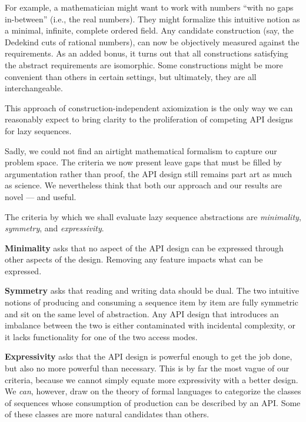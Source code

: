 \documentclass[sigplan,screen,10pt,review]{acmart}
\begin{document}
For example, a mathematician might want to work with numbers ``with no gaps in-between'' (i.e., the real numbers). They might formalize this intuitive notion as a minimal, infinite, complete ordered field. Any candidate construction (say, the Dedekind cuts of rational numbers), can now be objectively measured against the requirements. As an added bonus, it turns out that all constructions satisfying the abstract requirements are isomorphic. Some constructions might be more convenient than others in certain settings, but ultimately, they are all interchangeable.

This approach of construction-independent axiomization is the only way we can reasonably expect to bring clarity to the proliferation of competing API designs for lazy sequences.

Sadly, we could not find an airtight mathematical formalism to capture our problem space. The criteria we now present leave gaps that must be filled by argumentation rather than proof, the API design still remains part art as much as science. We nevertheless think that both our approach and our results are novel --- and useful.

The criteria by which we shall evaluate lazy sequence abstractions are \textit{minimality}, \textit{symmetry}, and \textit{expressivity}.

\textbf{Minimality} asks that no aspect of the API design can be expressed through other aspects of the design. Removing any feature impacts what can be expressed.


\textbf{Symmetry} asks that reading and writing data should be dual. The two intuitive notions of producing and consuming a sequence item by item are fully symmetric and sit on the same level of abstraction. Any API design that introduces an imbalance between the two is either contaminated with incidental complexity, or it lacks functionality for one of the two access modes.

\textbf{Expressivity} asks that the API design is powerful enough to get the job done, but also no more powerful than necessary. This is by far the most vague of our criteria, because we cannot simply equate more expressivity with a better design. We \textit{can}, however, draw on the theory of formal languages to categorize the classes of sequences whose consumption of production can be described by an API. Some of these classes are more natural candidates than others.
\end{document}
